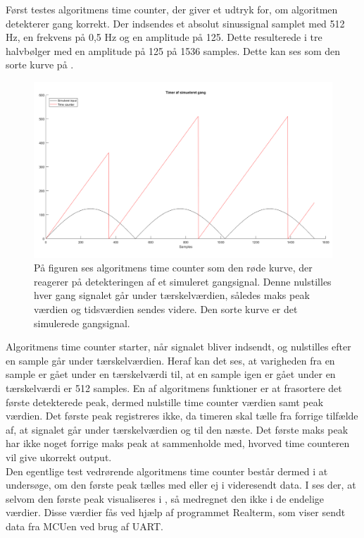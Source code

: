 Først testes algoritmens time counter, der giver et udtryk for, om algoritmen detekterer gang korrekt. Der indsendes et absolut sinussignal samplet med 512 Hz, en frekvens på 0,5 Hz og en amplitude på 125. Dette resulterede i tre halvbølger med en amplitude på 125 på 1536 samples. Dette kan ses som den sorte kurve på .
\begin{figure}[H]
	\centering
	\includegraphics[scale=0.3]{figures/cDesign/test_timecount_gang.png}
	\caption{På figuren ses algoritmens time counter som den røde kurve, der reagerer på detekteringen af et simuleret gangsignal. Denne nulstilles hver gang signalet går under tærskelværdien, således maks peak værdien og tidsværdien sendes videre. Den sorte kurve er det simulerede gangsignal.}
	\label{fig:testgraf_timecounter}
\end{figure}
Algoritmens time counter starter, når signalet bliver indsendt, og nulstilles efter en sample går under tærskelværdien. Heraf kan det ses, at varigheden fra en sample er gået under en tærskelværdi til, at en sample igen er gået under en tærskelværdi er 512 samples. En af algoritmens funktioner er at frasortere det første detekterede peak, dermed nulstille time counter værdien samt peak værdien. Det første peak registreres ikke, da timeren skal tælle fra forrige tilfælde af, at signalet går under tærskelværdien og til den næste. Det første maks peak har ikke noget forrige maks peak at sammenholde med, hvorved time counteren vil give ukorrekt output.\\
Den egentlige test vedrørende algoritmens time counter består dermed i at undersøge, om den første peak tælles med eller ej i videresendt data. I  ses der, at selvom den første peak visualiseres i , så medregnet den ikke i de endelige værdier. Disse værdier fås ved hjælp af programmet Realterm, som viser sendt data fra MCUen ved brug af UART.
